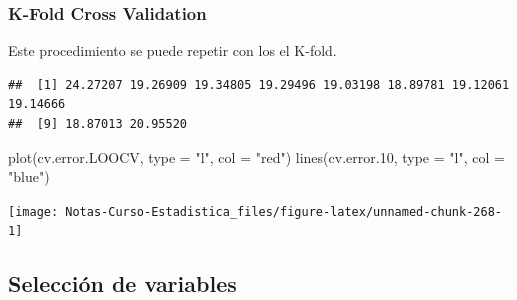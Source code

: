 \documentclass[
  12pt,
]{book}
\newenvironment{Shaded}{\begin{snugshade}}{\end{snugshade}}
\newcommand{\AttributeTok}[1]{\textcolor[rgb]{0.77,0.63,0.00}{#1}}
\newcommand{\ControlFlowTok}[1]{\textcolor[rgb]{0.13,0.29,0.53}{\textbf{#1}}}
\newcommand{\DecValTok}[1]{\textcolor[rgb]{0.00,0.00,0.81}{#1}}
\newcommand{\FloatTok}[1]{\textcolor[rgb]{0.00,0.00,0.81}{#1}}
\newcommand{\FunctionTok}[1]{\textcolor[rgb]{0.00,0.00,0.00}{#1}}
\newcommand{\NormalTok}[1]{#1}
\newcommand{\OtherTok}[1]{\textcolor[rgb]{0.56,0.35,0.01}{#1}}
\newcommand{\SpecialCharTok}[1]{\textcolor[rgb]{0.00,0.00,0.00}{#1}}
\newcommand{\StringTok}[1]{\textcolor[rgb]{0.31,0.60,0.02}{#1}}
\theoremstyle{definition}
\theoremstyle{definition}
\theoremstyle{definition}
\theoremstyle{remark}
\begin{document}
\hypertarget{k-fold-cross-validation}{%
\subsubsection{K-Fold Cross Validation}\label{k-fold-cross-validation}}

Este procedimiento se puede repetir con los el K-fold.

\begin{Shaded}
\end{Shaded}

\begin{verbatim}
##  [1] 24.27207 19.26909 19.34805 19.29496 19.03198 18.89781 19.12061 19.14666
##  [9] 18.87013 20.95520
\end{verbatim}

\begin{Shaded}
\begin{Highlighting}[]
\FunctionTok{plot}\NormalTok{(cv.error.LOOCV, }\AttributeTok{type =} \StringTok{"l"}\NormalTok{, }\AttributeTok{col =} \StringTok{"red"}\NormalTok{)}
\FunctionTok{lines}\NormalTok{(cv.error}\FloatTok{.10}\NormalTok{, }\AttributeTok{type =} \StringTok{"l"}\NormalTok{, }\AttributeTok{col =} \StringTok{"blue"}\NormalTok{)}
\end{Highlighting}
\end{Shaded}

\begin{center}\texttt{[image: Notas-Curso-Estadistica\_files/figure-latex/unnamed-chunk-268-1]} \end{center}

\hypertarget{selecciuxf3n-de-variables}{%
\subsection{Selección de variables}\label{selecciuxf3n-de-variables}}
\end{document}
